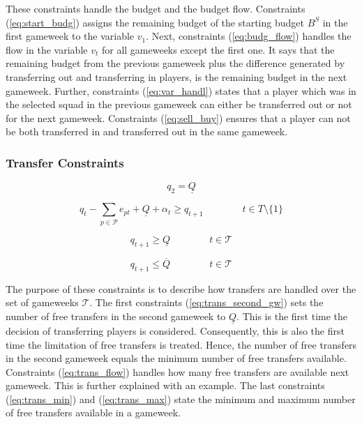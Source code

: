 These constraints handle the budget and the budget flow. Constraints (\ref{eq:start_budg}) assigns the remaining budget of the starting budget $B^{S}$ in the first gameweek to the variable $v_{1}$. Next, constraints (\ref{eq:budg_flow}) handles the  flow in the variable $v_{t}$ for all gameweeks except the first one. It says that the remaining budget from the previous gameweek plus the difference generated by transferring out and transferring in players, is the remaining budget in the next gameweek. Further, constraints (\ref{eq:var_handl}) states that a player which was in the selected squad in the previous gameweek can either be transferred out or not for the next gameweek. Constraints (\ref{eq:sell_buy}) ensures that a player can not be both transferred in and transferred out in the same gameweek. 

\subsubsection{Transfer Constraints} \label{cons:trans}

\begin{equation} \label{eq:trans_second_gw}
    q_{2} = \underline{Q}
\end{equation}

\begin{equation} \label{eq:trans_flow}
    q_{t}-\sum_{p \in \mathcal{P}}e_{pt} + \underline{Q} + \alpha_{t} \geq q_{t+1} \qquad\qquad t \in T\setminus\{1\}
\end{equation}

\begin{equation} \label{eq:trans_min}
    q_{t+1} \geq \underline{Q} \qquad\qquad t \in \mathcal{T}
\end{equation}

\begin{equation} \label{eq:trans_max}
    q_{t+1} \leq \overline{Q} \qquad\qquad t \in \mathcal{T}
\end{equation}

The purpose of these constraints is to describe how transfers are handled over the set of gameweeks $\mathcal{T}$. The first constraints (\ref{eq:trans_second_gw}) sets the number of free transfers in the second gameweek to $\underline{Q}$. This is the first time the decision of transferring players is considered. Consequently, this is also the first time the limitation of free transfers is treated. Hence, the number of free transfers in the second gameweek equals the minimum number of free transfers available. Constraints (\ref{eq:trans_flow}) handles how many free transfers are available next gameweek. This is further explained with an example. The last constraints (\ref{eq:trans_min}) and (\ref{eq:trans_max}) state the minimum and maximum number of free transfers available in a gameweek. 

